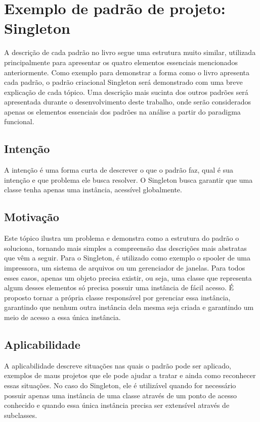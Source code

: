 \section{Exemplo de padrão de projeto: Singleton}

A descrição de cada padrão no livro segue uma estrutura 
muito similar, utilizada principalmente para apresentar 
os quatro elementos essenciais mencionados anteriormente. 
Como exemplo para demonstrar a forma como o livro 
apresenta cada padrão, o padrão criacional Singleton será 
demonstrado com uma breve explicação de cada tópico. 
Uma descrição mais sucinta dos outros padrões será 
apresentada durante o desenvolvimento deste 
trabalho, onde serão considerados apenas os elementos 
essenciais dos padrões na análise 
a partir do paradigma funcional.

\subsection*{Intenção}

A intenção é uma forma curta de descrever o que o padrão 
faz, qual é sua intenção e que problema ele busca resolver. 
O Singleton busca garantir que uma classe tenha apenas uma
instância, acessível globalmente.

\subsection*{Motivação}

Este tópico ilustra um problema e demonstra como a estrutura 
do padrão o soluciona, tornando mais simples a compreensão 
das descrições mais abstratas que vêm a seguir. Para o 
Singleton, é utilizado como exemplo o spooler de uma 
impressora, um sistema de arquivos ou um gerenciador de 
janelas. Para todos esses casos, apenas um objeto precisa existir, 
ou seja, uma classe que representa algum desses elementos 
só precisa possuir uma instância de fácil acesso. É proposto 
tornar a própria classe responsável por gerenciar essa 
instância, garantindo que nenhum outra instância dela 
mesma seja criada e garantindo um meio de acesso a essa 
única instância.

\subsection*{Aplicabilidade}

A aplicabilidade descreve situações nas quais o padrão 
pode ser aplicado, exemplos de maus projetos que ele pode 
ajudar a tratar e ainda como reconhecer essas situações. 
No caso do Singleton, ele é utilizável quando for necessário 
possuir apenas uma instância de uma classe através de um 
ponto de acesso conhecido e quando essa única instância 
precisa ser extensível através de subclasses. 

